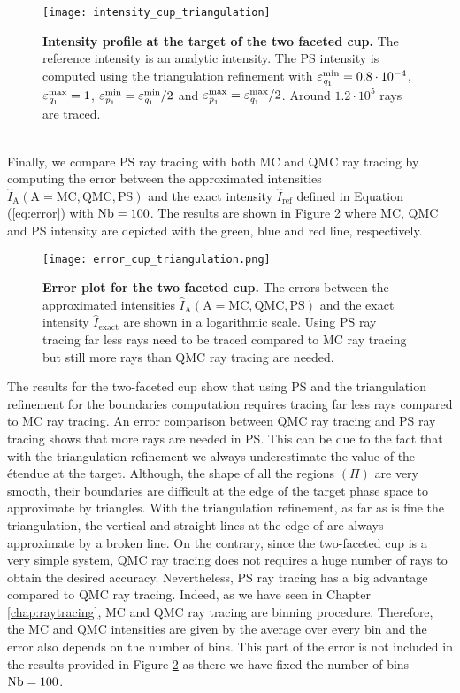  \begin{figure}[h!]
  \center
  \texttt{[image: intensity\_cup\_triangulation]}
  \caption{\textbf{Intensity profile at the target of the two faceted cup.} The reference intensity is an analytic intensity. The PS intensity is computed using the triangulation refinement with $\varepsilon_{\textit{q}_1}^{\textrm{min}}=0.8\cdot 10^{-4}$, $\varepsilon_{\textit{q}_1}^{\textrm{max}}=1$, $\varepsilon_{\textit{p}_1}^{\textrm{min}}=\varepsilon_{\textit{q}_1}^{\textrm{min}}/2$ and $\varepsilon_{\textit{p}_1}^{\textrm{max}}= \varepsilon_{\textit{q}_1}^{\textrm{max}}/2$. Around $1.2 \cdot 10^5$ rays are traced.}
  \label{fig:intensity_cup_triangulation}
\end{figure}
\\ \indent 
Finally, we compare PS ray tracing with both MC and QMC ray tracing by computing the error between the approximated intensities $\hat{I}_{\textrm{A}}  (\textrm{A}= \textrm{MC}, \textrm{QMC}, \textrm{PS})$ and the exact intensity $\hat{I}_{\textrm{ref}}$ defined in Equation (\ref{eq:error}) with $\textrm{Nb} = 100$. The results are shown in Figure \ref{fig:error_cup_triangulation} where MC, QMC and PS intensity are depicted with the green, blue and red line, respectively.
 \begin{figure}[h]
  \center
  \texttt{[image: error\_cup\_triangulation.png]}
  \caption{\textbf{Error plot for the two faceted cup.} The errors between the approximated intensities $\hat{I}_{\textrm{A}} (\textrm{A}= \textrm{MC}, \textrm{QMC}, \textrm{PS})$ and the exact intensity $\hat{I}_{\textrm{exact}}$ are shown in a logarithmic scale. Using PS ray tracing far less rays need to be traced compared to MC ray tracing but still more rays than QMC ray tracing are needed.}
  \label{fig:error_cup_triangulation}
\end{figure}
The results for the two-faceted cup show that using PS and the triangulation refinement for the boundaries computation requires tracing far less rays compared to MC ray tracing.
An error comparison between QMC ray tracing and PS ray tracing shows that more rays are needed in PS. This can be due to the fact that with the triangulation refinement we always underestimate the value of the \'{e}tendue at the target. Although, the shape of all the regions $(\Pi)$ are very smooth, their boundaries are difficult at the edge of the target phase space  to approximate by triangles. With the triangulation refinement, as far as is fine the triangulation, the vertical and straight lines at the edge of  are always approximate by a broken line. On the contrary, since the two-faceted cup is a very simple system, QMC ray tracing does not requires a huge number of rays to obtain the desired accuracy. Nevertheless, PS ray tracing has a big advantage compared to QMC ray tracing. Indeed, as we have seen in Chapter \ref{chap:raytracing}, MC and QMC ray tracing are binning procedure. Therefore, the MC and QMC intensities are given by the average over every bin and the error also depends on the number of bins. This part of the error is not included in the results provided in Figure \ref{fig:error_cup_triangulation} as there we have fixed the number of bins $\textrm{Nb} = 100$. %
